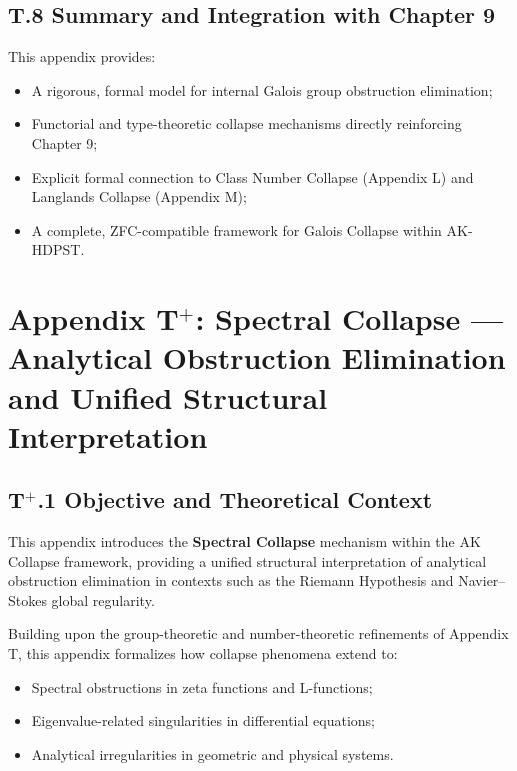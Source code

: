 \documentclass[11pt]{article}
\begin{document}
\subsection*{T.8 Summary and Integration with Chapter 9}

This appendix provides:

\begin{itemize}
    \item A rigorous, formal model for internal Galois group obstruction elimination;
    \item Functorial and type-theoretic collapse mechanisms directly reinforcing Chapter 9;
    \item Explicit formal connection to Class Number Collapse (Appendix L) and Langlands Collapse (Appendix M);
    \item A complete, ZFC-compatible framework for Galois Collapse within AK-HDPST.
\end{itemize}




\section*{Appendix T$^{+}$: Spectral Collapse — Analytical Obstruction Elimination and Unified Structural Interpretation}

\subsection*{T$^{+}$.1 Objective and Theoretical Context}

This appendix introduces the \textbf{Spectral Collapse} mechanism within the AK Collapse framework, providing a unified structural interpretation of analytical obstruction elimination in contexts such as the Riemann Hypothesis and Navier--Stokes global regularity.

Building upon the group-theoretic and number-theoretic refinements of Appendix T, this appendix formalizes how collapse phenomena extend to:

\begin{itemize}
    \item Spectral obstructions in zeta functions and L-functions;
    \item Eigenvalue-related singularities in differential equations;
    \item Analytical irregularities in geometric and physical systems.
\end{itemize}
\end{document}
